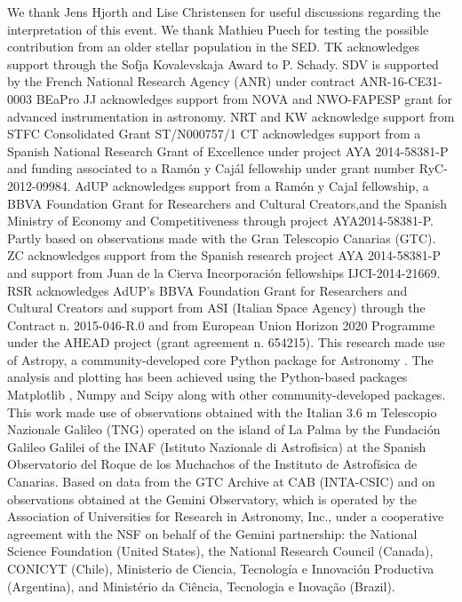 \documentclass{aa}    %
\begin{document}
\begin{acknowledgements}
We thank Jens Hjorth and Lise Christensen for useful discussions regarding the interpretation of this event. We thank Mathieu Puech for testing the possible contribution from an older stellar population in the SED.
%	
TK acknowledges support through the Sofja Kovalevskaja Award to P. Schady.
%
SDV is supported by the French National Research Agency (ANR) under contract ANR-16-CE31-0003 BEaPro 
%
JJ acknowledges support from NOVA and NWO-FAPESP grant for advanced
instrumentation in astronomy.
%
NRT and KW acknowledge support from STFC Consolidated
Grant ST/N000757/1
%
CT acknowledges support from a Spanish National Research Grant of Excellence
under project AYA 2014-58381-P and funding associated to a Ramón y Cajál
fellowship under grant number RyC-2012-09984.
%
AdUP acknowledges support from a Ramón y Cajal fellowship, a BBVA Foundation
Grant for Researchers and Cultural Creators,and the Spanish Ministry of Economy
and Competitiveness through project AYA2014-58381-P. Partly based on
observations made with the Gran Telescopio Canarias (GTC).
%
ZC acknowledges support from the Spanish research project AYA 2014-58381-P and
support from Juan de la Cierva Incorporaci\'on fellowships IJCI-2014-21669.
%
RSR acknowledges AdUP's BBVA Foundation Grant for Researchers and Cultural
Creators and support from ASI (Italian Space Agency) through the Contract n. 2015-046-R.0 and from European Union Horizon 2020 Programme under the AHEAD project (grant agreement n. 654215).
%
This research made use of Astropy, a community-developed core Python package for Astronomy \citep{TheAstropyCollaboration2013}. The analysis and plotting has been achieved using the Python-based packages Matplotlib \citep{Hunter2007}, Numpy and Scipy \citep{VanderWalt2011} along with other community-developed packages.
%
This work made use of observations obtained with the Italian 3.6 m Telescopio Nazionale Galileo (TNG) operated on the island of La Palma by the Fundaci\'on Galileo Galilei of the INAF (Istituto Nazionale di Astrofisica) at the Spanish Observatorio del Roque de los Muchachos of the Instituto de Astrof\'isica de Canarias.
%
Based on data from the GTC Archive at CAB (INTA-CSIC) and on observations obtained at the Gemini Observatory, which is operated by the Association of Universities for Research in Astronomy, Inc., under a cooperative agreement with the NSF on behalf of the Gemini partnership: the National Science Foundation (United States), the National Research Council (Canada), CONICYT (Chile), Ministerio de Ciencia, Tecnología e Innovación Productiva (Argentina), and Ministério da Ciência, Tecnologia e Inovação (Brazil).

\end{acknowledgements}



\end{document}
